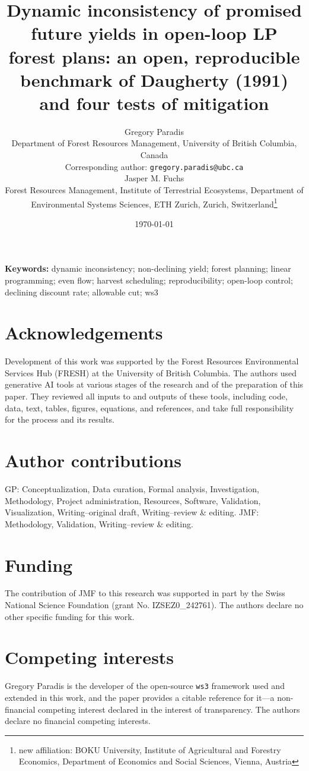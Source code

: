 \documentclass[12pt]{article}
\title{Dynamic inconsistency of promised future yields in open-loop LP forest plans: an open, reproducible benchmark of Daugherty (1991) and four tests of mitigation}
\author{Gregory Paradis\\Department of Forest Resources Management, University of British Columbia, Canada\\Corresponding author: \texttt{gregory.paradis@ubc.ca}\\[0.75em] Jasper M. Fuchs\\Forest Resources Management, Institute of Terrestrial Ecosystems, Department of Environmental Systems Sciences, ETH Zurich, Zurich, Switzerland\protect\footnote{new affiliation: BOKU University, Institute of Agricultural and Forestry Economics, Department of Economics and Social Sciences, Vienna, Austria}}
\date{\today}
\begin{document}
\maketitle

\noindent\textbf{Keywords:} dynamic inconsistency; non-declining yield; forest planning; linear programming; even flow; harvest scheduling; reproducibility; open-loop control; declining discount rate; allowable cut; ws3










\section*{Acknowledgements}
Development of this work was supported by the Forest Resources Environmental Services Hub (FRESH) at the University of British Columbia. The authors used generative AI tools at various stages of the research and of the preparation of this paper. They reviewed all inputs to and outputs of these tools, including code, data, text, tables, figures, equations, and references, and take full responsibility for the process and its results.

\section*{Author contributions}
GP: Conceptualization, Data curation, Formal analysis, Investigation, Methodology, Project administration, Resources, Software, Validation, Visualization, Writing--original draft, Writing--review \& editing. JMF: Methodology, Validation, Writing--review \& editing.

\section*{Funding}
The contribution of JMF to this research was supported in part by the Swiss National Science Foundation (grant No. IZSEZ0\_242761). The authors declare no other specific funding for this work.

\section*{Competing interests}
Gregory Paradis is the developer of the open-source \texttt{ws3} framework used and extended in this work, and the paper provides a citable reference for it---a non-financial competing interest declared in the interest of transparency. The authors declare no financial competing interests.
\end{document}
